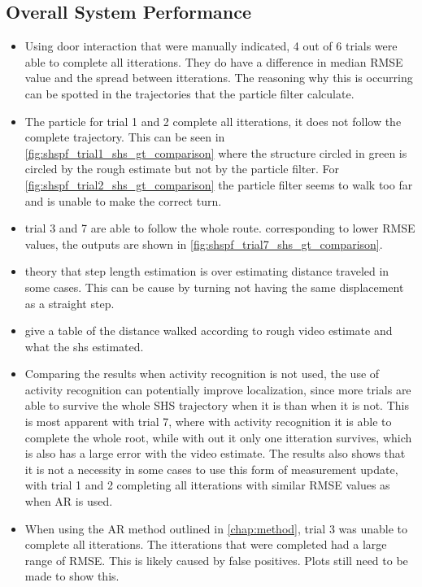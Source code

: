 \newpage
\subsection*{Overall System Performance}

\begin{itemize}
	\item Using door interaction that were manually indicated, 4 out of 6 trials were able to complete all itterations. They do have a difference in median RMSE value and the spread between itterations. The reasoning why this is occurring can be spotted in the trajectories that the particle filter calculate.  
	\item The particle for trial 1 and 2 complete all itterations, it does not follow the complete trajectory. This can be seen in  \cref{fig:shspf_trial1_shs_gt_comparison} where the structure circled in green is circled by the rough estimate but not by the particle filter. For \cref{fig:shspf_trial2_shs_gt_comparison} the particle filter seems to walk too far and is unable to make the correct turn.
	\item trial 3 and 7 are able to follow the whole route. corresponding to lower RMSE values, the outputs are shown in \cref{fig:shspf_trial7_shs_gt_comparison}.
	\item theory that step length estimation is over estimating distance traveled in some cases. This can be cause by turning not having the same displacement as a straight step.
	\item give a table of the distance walked according to rough video estimate and what the shs estimated.
	\item Comparing the results when activity recognition is not used, the use of activity recognition can potentially improve localization, since more trials are able to survive the whole SHS trajectory when it is than when it is not. This is most apparent with trial 7, where with activity recognition it is able to complete the whole root, while with out it only one itteration survives, which is also has a large error with the video estimate. The results also shows that it is not a necessity in some cases to use this form of measurement update, with trial 1 and 2 completing all itterations with similar RMSE values as when AR is used.
	\item When using the AR method outlined in \cref{chap:method}, trial 3 was unable to complete all itterations. The itterations that were completed had a large range of RMSE. This is likely caused by false positives. Plots still need to be made to show this.
\end{itemize}


